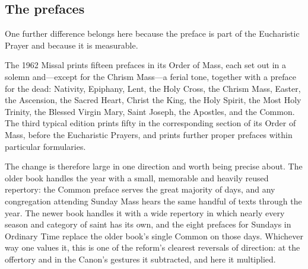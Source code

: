 \subsection{The prefaces}

One further difference belongs here because the preface is part of the Eucharistic Prayer and because it is measurable.

The 1962 Missal prints fifteen prefaces in its Order of Mass, each set out in a solemn and---except for the Chrism Mass---a ferial tone, together with a preface for the dead: Nativity, Epiphany, Lent, the Holy Cross, the Chrism Mass, Easter, the Ascension, the Sacred Heart, Christ the King, the Holy Spirit, the Most Holy Trinity, the Blessed Virgin Mary, Saint Joseph, the Apostles, and the Common. The third typical edition prints fifty in the corresponding section of its Order of Mass, before the Eucharistic Prayers, and prints further proper prefaces within particular formularies.

The change is therefore large in one direction and worth being precise about. The older book handles the year with a small, memorable and heavily reused repertory: the Common preface serves the great majority of days, and any congregation attending Sunday Mass hears the same handful of texts through the year. The newer book handles it with a wide repertory in which nearly every season and category of saint has its own, and the eight prefaces for Sundays in Ordinary Time replace the older book's single Common on those days. Whichever way one values it, this is one of the reform's clearest reversals of direction: at the offertory and in the Canon's gestures it subtracted, and here it multiplied.


